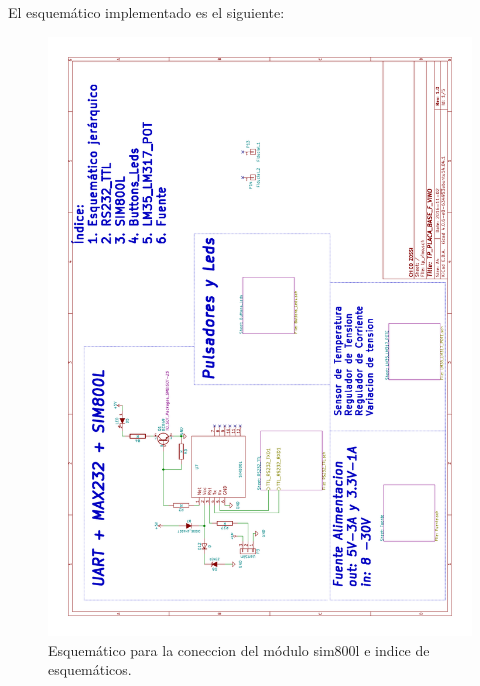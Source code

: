 El esquemático implementado es el siguiente:
\begin{figure}[h]
      \centering
      \includegraphics[page=1,scale=0.3,angle=270]{./Figures/schematic.pdf}
      \caption{Esquemático para la coneccion del módulo sim800l e indice de esquemáticos.}
      \label{fig:essim800}
\end{figure}

